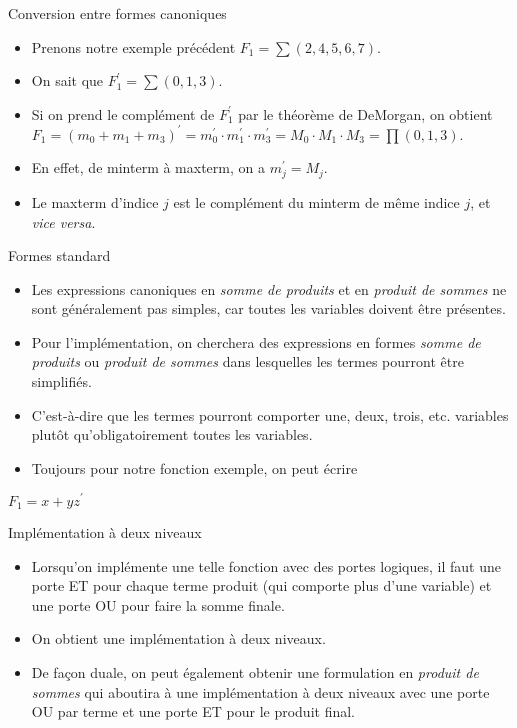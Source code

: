 \documentclass[presentation]{beamer}
\begin{document}
\begin{frame}[label={sec:orga3af2c9}]{Conversion entre formes canoniques}
\begin{itemize}
\item Prenons notre exemple précédent \(F_1 = \sum (2, 4, 5, 6, 7)\).

\item On sait que \(F_1^\prime = \sum (0,1,3)\).

\item Si on prend le complément de \(F_1^\prime\) par le théorème de DeMorgan, on obtient \(F_1 = (m_0 + m_1 + m_3)^\prime = m_0^\prime \cdot m_1^\prime \cdot m_3^\prime = M_0 \cdot M_1 \cdot M_3 = \prod (0,1,3)\).

\item En effet, de minterm à maxterm, on a \(m_j^\prime = M_j\).

\item Le maxterm d'indice \(j\) est le complément du minterm de même indice \(j\), et \emph{vice versa}.
\end{itemize}
\end{frame}

\begin{frame}[label={sec:orgb40a2d3}]{Formes standard}
\begin{itemize}
\item Les expressions canoniques en \emph{somme de produits} et en \emph{produit de sommes} ne sont généralement pas simples, car toutes les variables doivent être présentes.

\item Pour l'implémentation, on cherchera des expressions en formes \emph{somme de produits} ou \emph{produit de sommes} dans lesquelles les termes pourront être simplifiés.

\item C'est-à-dire que les termes pourront comporter une, deux, trois, etc. variables plutôt qu'obligatoirement \alert{toutes} les variables.

\item Toujours pour notre fonction exemple, on peut écrire
\end{itemize}

\(F_1 = x + y z^\prime\)
\end{frame}

\begin{frame}[label={sec:orgf4114cb}]{Implémentation à deux niveaux}
\begin{itemize}
\item Lorsqu'on implémente une telle fonction avec des portes logiques, il faut une porte ET pour chaque terme produit (qui comporte plus d'une variable) et une porte OU pour faire la somme finale.

\item On obtient une implémentation à deux niveaux.

\item De façon duale, on peut également obtenir une formulation en \emph{produit de sommes} qui aboutira à une implémentation à deux niveaux avec une porte OU par terme et une porte ET pour le produit final.
\end{itemize}
\end{frame}
\end{document}
